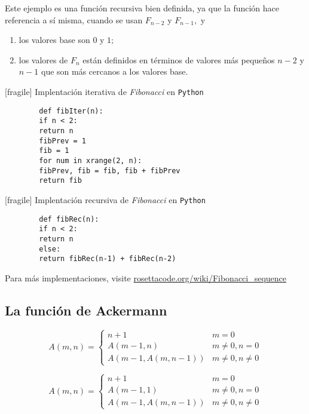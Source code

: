 	Este ejemplo es una función recursiva bien definida, ya que la función hace referencia a sí misma, cuando se usan $ F_{n-2}$ y $F_{n-1},$ y
	\begin{enumerate}
		\item los valores base son $0$ y $1;$
		\item los valores de $F_{n}$ están definidos en t\'erminos de valores más peque\~nos $n-2$ y $n-1$ que son más cercanos a los valores base.
	\end{enumerate}
	


[fragile]
	{Implentación iterativa de \emph{Fibonacci} en \texttt{Python}}
	\begin{verbatim}
		def fibIter(n):
		if n < 2:
		return n
		fibPrev = 1
		fib = 1
		for num in xrange(2, n):
		fibPrev, fib = fib, fib + fibPrev
		return fib
	\end{verbatim} 


[fragile]
	{Implentación recursiva de \emph{Fibonacci} en \texttt{Python}}
	\begin{verbatim}
		def fibRec(n):
		if n < 2:
		return n
		else:
		return fibRec(n-1) + fibRec(n-2)
	\end{verbatim}
	Para más implementaciones, visite \href{http://rosettacode.org/wiki/Fibonacci\_sequence}{rosettacode.org/wiki/Fibonacci\_sequence}


\subsection{La función de Ackermann}


	\begin{defn}
		$$
		A(m,n)=
		\begin{cases}
			n+1 & m=0\\
			A(m-1,n) & m\neq0, n=0 \\
			A(m-1, A(m,n-1)) & m\neq 0, n\neq 0
		\end{cases}
		$$
	\end{defn}
	



	\begin{defn}
		$$
		A(m,n)=
		\begin{cases}
			n+1 & m=0\\
			A(m-1,1) & m\neq0, n=0 \\
			A(m-1, A(m,n-1)) & m\neq 0, n\neq 0
		\end{cases}
		$$
	\end{defn}
	


